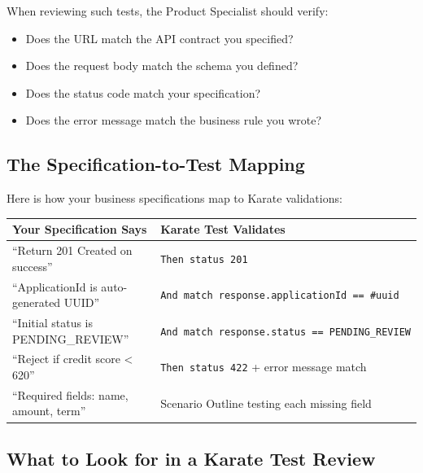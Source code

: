 When reviewing such tests, the Product Specialist should verify:

\begin{itemize}
\tightlist
\item
  Does the URL match the API contract you specified?
\item
  Does the request body match the schema you defined?
\item
  Does the status code match your specification?
\item
  Does the error message match the business rule you wrote?
\end{itemize}

\subsection{The Specification-to-Test
Mapping}\label{the-specification-to-test-mapping}

Here is how your business specifications map to Karate validations:

\begin{longtable}[]{@{}
  >{\raggedright\arraybackslash}p{}
  >{\raggedright\arraybackslash}p{}@{}}
\toprule\noalign{}
\begin{minipage}[b]{\linewidth}\raggedright
Your Specification Says
\end{minipage} & \begin{minipage}[b]{\linewidth}\raggedright
Karate Test Validates
\end{minipage} \\
\midrule\noalign{}
\endhead
\bottomrule\noalign{}
\endlastfoot
``Return 201 Created on success'' & \texttt{Then\ status\ 201} \\
``ApplicationId is auto-generated UUID'' &
\texttt{And\ match\ response.applicationId\ ==\ \textquotesingle{}\#uuid\textquotesingle{}} \\
``Initial status is PENDING\_REVIEW'' &
\texttt{And\ match\ response.status\ ==\ \textquotesingle{}PENDING\_REVIEW\textquotesingle{}} \\
``Reject if credit score \textless{} 620'' & \texttt{Then\ status\ 422}
+ error message match \\
``Required fields: name, amount, term'' & Scenario Outline testing each
missing field \\
\end{longtable}

\subsection{What to Look for in a Karate Test
Review}\label{what-to-look-for-in-a-karate-test-review}

